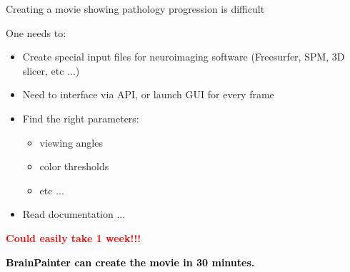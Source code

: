 \documentclass[10pt,xcolor=table,aspectratio=169]{beamer}
\begin{document}
\begin{frame}[t]{Creating a movie showing pathology progression is difficult}
 
 One needs to:
\begin{itemize}
 \item Create special input files for neuroimaging software (Freesurfer, SPM, 3D slicer, etc ...)
 \item Need to interface via API, or launch GUI for every frame
 \item Find the right parameters:
\begin{itemize}
  \item viewing angles
  \item color thresholds
  \item etc ...
\end{itemize}
 \item Read documentation ...

 \end{itemize}

 \textbf{\textcolor{red}{Could easily take 1 week!!!}}

\vspace{2em}
 \textbf{\textcolor{black}{BrainPainter can create the movie in 30 minutes.}}
 

 
\end{frame}
\end{document}
